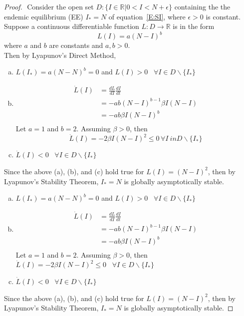 \begin{proof} $ $\newline
    Consider the open set $D: \{I \in \mathbb{R}| 0 < I < N+ \epsilon \}$ containing the the endemic equilibrium (EE) $I_* = N$ of equation~\eqref{E:SI}, where $\epsilon > 0$ is constant.
    Suppose a continuous differentiable function $L:D\rightarrow \mathbb{R}$  is in the form
    \begin{equation}
        L(I) = a(N-I)^b
    \end{equation}
    where $a$ and $b$ are constants and $a, b > 0$.\\
    Then by Lyapunov's Direct Method,
    \begin{enumerate}[(a)]
        \item $L(I_*) = a(N-N)^b = 0$ and $L(I)>0$ \, $\forall I\in D\backslash \{I_*\}$
        \item
        \begin{align*}
            \dot{L}(I)  &= \frac{dL}{dI} \frac{dI}{dt} \\
            &= -ab(N-I)^{b-1}\beta I(N-I)\\
            &= -ab\beta I(N-I)^b\\
        \end{align*}
        Let $a = 1$ and $b = 2$. Assuming $\beta>0$, then
        $$\dot{L}(I) = -2\beta I(N-I)^2 \leq 0 \, \forall I\ in D \backslash \{I_*\}$$
        \item $\dot{L}(I) < 0$ \, $\forall I\in D\backslash \{I_*\}$
    \end{enumerate}
    Since the above (a), (b), and (c) hold true for $L(I) = (N-I)^2$, then by Lyapunov's Stability Theorem, $I_* = N$ is globally asymptotically stable.
    \begin{enumerate}[(a)]
        \item $L(I_*) = a(N-N)^b = 0$ and $L(I)>0$ \, $\forall I\in D\backslash \{I_*\}$
        \item
        \begin{align*}
            \dot{L}(I)  &= \frac{dL}{dI} \frac{dI}{dt} \\
            &= -ab(N-I)^{b-1}\beta I(N-I)\\
            &= -ab\beta I(N-I)^b\\
        \end{align*}
        Let $a = 1$ and $b = 2$. Assuming $\beta>0$, then\\
        $\dot{L}(I) = -2\beta I(N-I)^2 \leq 0$ \, $\forall I\in D \backslash \{I_*\}$
        \item $\dot{L}(I) < 0$ \, $\forall I\in D\backslash \{I_*\}$
    \end{enumerate}
    Since the above (a), (b), and (c) hold true for $L(I) = (N-I)^2$, then by Lyapunov's Stability Theorem, $I_* = N$ is globally asymptotically stable.
\end{proof}
